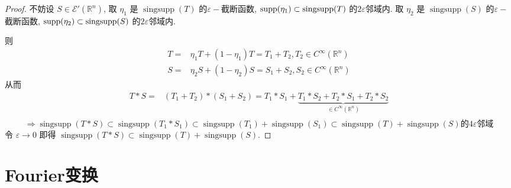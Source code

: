\documentclass[11pt]{ctexart}[UTF8]
\begin{document}
\begin{proof}
    不妨设 $S \in \mathscr{E}'(\mathbb{R}^{n})$, 取 $\eta_{1}$ 是 $\operatorname{singsupp}(T)$ 的$\varepsilon-$截断函数, $\operatorname{supp}(\eta_{1}) \subset \operatorname{singsupp}(T)$ 的$2\varepsilon$邻域内.
    取 $\eta_{2}$ 是 $\operatorname{singsupp}(S)$ 的$\varepsilon-$截断函数, $\operatorname{supp}(\eta_{2}) \subset \operatorname{singsupp}(S)$ 的$2\varepsilon$邻域内.\par
    则
    \begin{equation*}
        \begin{aligned}
            T = & \eta_{1}T + (1-\eta_{1})T = T_{1}+T_{2}, T_{2}\in C^{\infty}(\mathbb{R}^n)\\
            S = & \eta_{2}S + (1-\eta_{2})S = S_{1}+S_{2}, S_{2} \in C^{\infty}(\mathbb{R}^n)
        \end{aligned}
    \end{equation*}
    从而
    \begin{equation*}
        \begin{aligned}
            T * S = & (T_{1}+T_{2}) * (S_{1}+S_{2}) = T_{1}*S_{1} + \underbrace{T_{1}*S_{2} + T_{2}*S_{1} + T_{2}*S_{2}}_{\in C^{\infty}(\mathbb{R}^n)}\\
        \end{aligned}
    \end{equation*}
    \begin{equation*}
        \Longrightarrow \operatorname{singsupp}(T * S) \subset \operatorname{singsupp}(T_{1}*S_{1}) \subset \operatorname{singsupp}(T_{1}) + \operatorname{singsupp}(S_{1}) \subset \operatorname{singsupp}(T) + \operatorname{singsupp}(S)\text{的}4\varepsilon\text{邻域}
    \end{equation*}
    令 $\varepsilon \to 0$ 即得 $\operatorname{singsupp}(T * S) \subset \operatorname{singsupp}(T) + \operatorname{singsupp}(S)$.
\end{proof}

\newpage
\section{Fourier变换}
\end{document}
